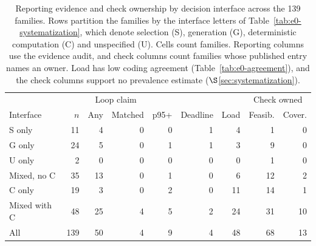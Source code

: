 \begin{table}[t]
\centering\footnotesize
\setlength{\tabcolsep}{2.6pt}
\renewcommand{\arraystretch}{1.05}
\caption{Reporting evidence and check ownership by decision interface across the 139 families. Rows partition the families by the interface letters of Table~\ref{tab:e0-systematization}, which denote selection (S), generation (G), deterministic computation (C) and unspecified (U). Cells count families. Reporting columns use the evidence audit, and check columns count families whose published entry names an owner. Load has low coding agreement (Table~\ref{tab:e0-agreement}), and the check columns support no prevalence estimate ($\S$\ref{sec:systematization}).}\label{tab:taxonomy-patterns}
\begin{tabular}{@{}lrrrrrrrr@{}}
\toprule
\rowcolor{ebBlue} & & \multicolumn{2}{c}{Loop claim} & & & & \multicolumn{2}{c}{Check owned} \\
\rowcolor{ebBlue} Interface & $n$ & Any & Matched & p95+ & Deadline & Load & Feasib. & Cover. \\
\midrule
S only & 11 & 4 & 0 & 0 & 1 & 4 & 1 & 0 \\
G only & 24 & 5 & 0 & 1 & 1 & 3 & 9 & 0 \\
U only & 2 & 0 & 0 & 0 & 0 & 0 & 1 & 0 \\
Mixed, no C & 35 & 13 & 0 & 1 & 0 & 6 & 12 & 2 \\
\midrule
C only & 19 & 3 & 0 & 2 & 0 & 11 & 14 & 1 \\
Mixed with C & 48 & 25 & 4 & 5 & 2 & 24 & 31 & 10 \\
\midrule
All & 139 & 50 & 4 & 9 & 4 & 48 & 68 & 13 \\
\bottomrule
\end{tabular}
\end{table}
